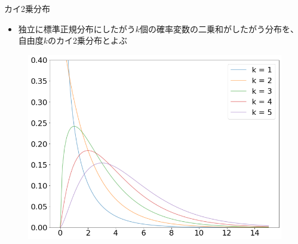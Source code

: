 \documentclass[aspectratio=169,unicode,dvipdfmx,14pt]{beamer}
\begin{document}
\begin{frame}{カイ2乗分布}
\begin{itemize}
\item 独立に標準正規分布にしたがう$k$個の確率変数の二乗和がしたがう分布を、自由度$k$のカイ2乗分布とよぶ
\end{itemize}
\begin{figure}[htbp]
\begin{center}
\includegraphics[scale=.3]{chi2.png}
\end{center}
\end{figure}
\end{frame}
\end{document}
